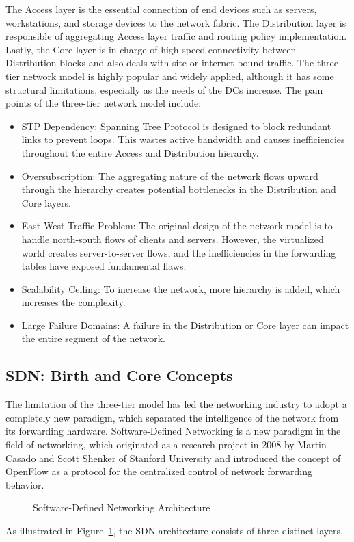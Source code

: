 The Access layer is the essential connection of end devices such as servers, workstations, and storage devices to the network fabric. The Distribution layer is responsible of aggregating Access layer traffic and routing policy implementation. Lastly, the Core layer is in charge of high-speed connectivity between Distribution blocks and also deals with site or internet-bound traffic.
The three-tier network model is highly popular and widely applied, although it has some structural limitations, especially as the needs of the DCs increase. The pain points of the three-tier network model include:
\begin{itemize}
    \item STP Dependency: Spanning Tree Protocol is designed to block redundant links to prevent loops. This wastes active bandwidth and causes inefficiencies throughout the entire Access and Distribution hierarchy.
    \item Oversubscription: The aggregating nature of the network flows upward through the hierarchy creates potential bottlenecks in the Distribution and Core layers.
    \item East-West Traffic Problem: The original design of the network model is to handle north-south flows of clients and servers. However, the virtualized world creates server-to-server flows, and the inefficiencies in the forwarding tables have exposed fundamental flaws.
    \item Scalability Ceiling: To increase the network, more hierarchy is added, which increases the complexity.
    \item Large Failure Domains: A failure in the Distribution or Core layer can impact the entire segment of the network.
\end{itemize}

\subsection*{SDN: Birth and Core Concepts}
The limitation of the three-tier model has led the networking industry to adopt a completely new paradigm, which separated the intelligence of the network from its forwarding hardware. Software-Defined Networking is a new paradigm in the field of networking, which originated as a research project in 2008 by Martin Casado and Scott Shenker of Stanford University and introduced the concept of OpenFlow as a protocol for the centralized control of network forwarding behavior.

\begin{figure}[!htbp]
    \centering
    \SDNarchitecture
    \caption{Software-Defined Networking Architecture}
    \label{fig:sdn-architecture}
\end{figure}
As illustrated in Figure~\ref{fig:sdn-architecture}, the SDN architecture consists of three distinct layers.

